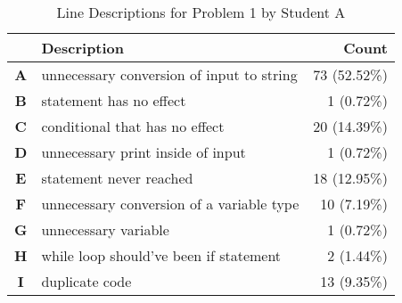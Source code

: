 \begin{table}
\centering
\caption{Line Descriptions for Problem 1 by Student A}
\label{table:problem1_studentA}
\renewcommand{\arraystretch}{0.5}
\begin{tabular}{|c|l|r|}
\hline
\textbf{}  & \textbf{Description}                      & \textbf{Count}        \\ \hline
\textbf{A} & unnecessary conversion of input to string & 73 (52.52\%) \\ \hline
\textbf{B} & statement has no effect                   & 1 (0.72\%)   \\ \hline
\textbf{C} & conditional that has no effect            & 20 (14.39\%) \\ \hline
\textbf{D} & unnecessary print inside of input         & 1 (0.72\%)   \\ \hline
\textbf{E} & statement never reached                   & 18 (12.95\%) \\ \hline
\textbf{F} & unnecessary conversion of a variable type & 10 (7.19\%)  \\ \hline
\textbf{G} & unnecessary variable                      & 1 (0.72\%)   \\ \hline
\textbf{H} & while loop should've been if statement    & 2 (1.44\%)   \\ \hline
\textbf{I} & duplicate code                            & 13 (9.35\%)  \\ \hline
\end{tabular}
\end{table}
%

